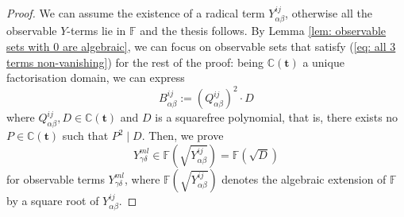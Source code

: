 \documentclass[10pt,a4paper]{amsart}
\begin{document}
\begin{proof}
We can assume the existence of a radical term $Y_{\alpha\beta}^{ij}$, otherwise all the observable $Y$-terms lie in $\mathbb{F}$ and the thesis follows. 
By Lemma \ref{lem: observable sets with 0 are algebraic}, we can focus on observable sets that satisfy (\ref{eq: all 3 terms non-vanishing}) for the rest of the proof: being $\mathbb{C}(\mathbf{t})$ a unique factorisation domain, we can express 
 \begin{equation}
B_{\alpha\beta}^{ij}:=\left(Q_{\alpha\beta}^{ij}\right)^{2}\cdot D\label{eq: factorization square and squarefree}
 \end{equation}
where $Q_{\alpha\beta}^{ij},D\in\mathbb{C}(\mathbf{t})$ and $D$ is a squarefree polynomial, that is, there exists no $P\in\mathbb{C}(\mathbf{t})$ such that $P^{2}\mid D$. Then, we prove   
 \begin{equation}
Y_{\gamma\delta}^{ml}\in\mathbb{F}(\sqrt{Y_{\alpha\beta}^{ij}})=\mathbb{F}(\sqrt{D})
\label{eq: same algebraic extension}
 \end{equation}
for observable terms $Y_{\gamma\delta}^{ml}$, where $\mathbb{F}(\sqrt{Y_{\alpha\beta}^{ij}})$ denotes the algebraic extension of $\mathbb{F}$ by a square root of $Y_{\alpha\beta}^{ij}$.


\end{proof}
\end{document}
